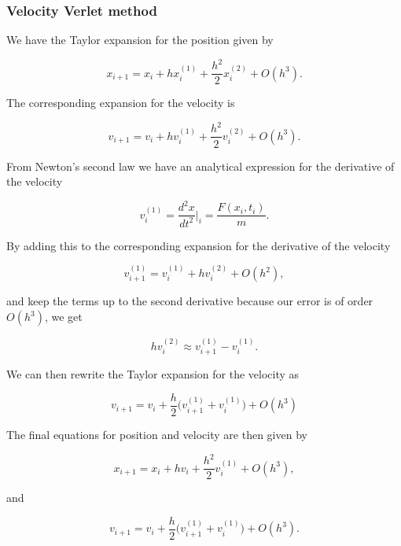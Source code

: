 \documentclass[a4paper, fontsize=11pt]{article}
\begin{document}
\subsubsection{Velocity Verlet method}
We have the Taylor expansion for the position given by

\begin{equation}
x_{i+1}=x_{i} + h x_{i}^{(1)} + \dfrac{h^2}{2} x_{i}^{(2)} + O(h^3).
\end{equation}

The corresponding expansion for the velocity is 

\begin{equation}
v_{i+1} = v_{i} +h v_{i}^{(1)} + \dfrac{h^2}{2} v_{i}^{(2)} + O(h^3).
\end{equation}

From Newton's second law we have an analytical expression for the derivative of the velocity

\begin{equation}
v_{i}^{(1)}=\dfrac{d^2x}{dt^2}\rvert_{i} = \dfrac{F(x_{i}, t_{i})}{m}.
\end{equation}

By adding this to the corresponding expansion for the derivative of the velocity 

\begin{equation}
v_{i+1}^{(1)} = v_{i}^{(1)} + h v_{i}^{(2)} + O(h^2),
\end{equation}

and keep the terms up to the second derivative because our error is of order $O(h^3)$, we get

\begin{equation}
h v_{i}^{(2)} \approx v_{i+1}^{(1)} - v_{i}^{(1)}.
\end{equation}

We can then rewrite the Taylor expansion for the velocity as 

\begin{equation}
v_{i+1} = v_{i} + \dfrac{h}{2}\Big( v_{i+1}^{(1)} + v_{i}^{(1)} \Big) + O(h^3)
\end{equation}

The final equations for position and velocity are then given by

\begin{equation}
x_{i+1} = x_{i} + h v_{i} + \dfrac{h^2}{2} v_{i}^{(1)} + O(h^3),
\end{equation}

and 

\begin{equation}
v_{i+1} = v_{i} + \dfrac{h}{2} \Big( v_{i+1}^{(1)} +v_{i}^{(1)} \Big) + O(h^3).
\end{equation}
\end{document}
